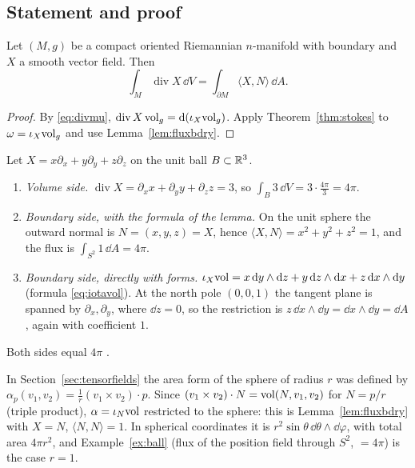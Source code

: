 \subsection{Statement and proof}

\begin{theorem}\label{thm:gauss}
Let $(M,g)$ be a compact oriented Riemannian $n$-manifold with boundary and $X$ a smooth vector field. Then
\[
\int_M\operatorname{div}X\,\dd V=\int_{\partial M}\langle X,N\rangle\,\dd A .
\]
\end{theorem}
\begin{proof}
By \eqref{eq:divmu}, $\operatorname{div}X\,\mathrm{vol}_g=\mathrm{d}(\iota_X\mathrm{vol}_g)$. Apply Theorem~\ref{thm:stokes} to $\omega=\iota_X\mathrm{vol}_g$ and use Lemma~\ref{lem:fluxbdry}.
\end{proof}

\begin{example}\label{ex:ball}
Let $X=x\partial_x+y\partial_y+z\partial_z$ on the unit ball $B\subset\mathbb{R}^3$.
\begin{enumerate}
\item \emph{Volume side.} $\operatorname{div}X=\partial_xx+\partial_yy+\partial_zz=3$, so $\int_B3\,\dd V=3\cdot\frac{4\pi}3=4\pi$.
\item \emph{Boundary side, with the formula of the lemma.} On the unit sphere the outward normal is $N=(x,y,z)=X$, hence $\langle X,N\rangle=x^2+y^2+z^2=1$, and the flux is $\int_{S^2}1\,\dd A=4\pi$.
\item \emph{Boundary side, directly with forms.} $\iota_X\mathrm{vol}=x\,\mathrm{d} y\wedge\mathrm{d} z+y\,\mathrm{d} z\wedge\mathrm{d} x+z\,\mathrm{d} x\wedge\mathrm{d} y$ (formula \eqref{eq:iotavol}). At the north pole $(0,0,1)$ the tangent plane is spanned by $\partial_x,\partial_y$, where $\dd z=0$, so the restriction is $z\,\dd x\wedge\dd y=\dd x\wedge\dd y=\dd A$, again with coefficient $1$.
\end{enumerate}
Both sides equal $4\pi$ \checkmark.
\end{example}

\begin{synthesis}\label{syn:sphere}
In Section~\ref{sec:tensorfields} the area form of the sphere of radius $r$ was defined by $\alpha_p(v_1,v_2)=\frac1r(v_1\times v_2)\cdot p$. Since $(v_1\times v_2)\cdot N=\mathrm{vol}(N,v_1,v_2)$ for $N=p/r$ (triple product),
$\alpha=\iota_N\mathrm{vol}$ restricted to the sphere: this is Lemma~\ref{lem:fluxbdry} with $X=N$, $\langle N,N\rangle=1$. In spherical coordinates it is $r^2\sin\theta\,\dd\theta\wedge\dd\varphi$, with total area $4\pi r^2$, and Example~\ref{ex:ball} (flux of the position field through $S^2$, $=4\pi$) is the case $r=1$.
\end{synthesis}
